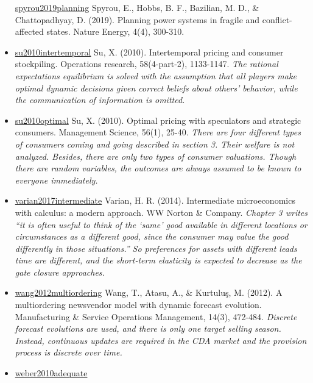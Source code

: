 \documentclass[letterpaper,8pt,twocolumn,twoside,]{pinp}
\begin{document}
\begin{itemize}
  \href{https://www.nature.com/articles/s41560-019-0346-x}{spyrou2019planning}
  Spyrou, E., Hobbs, B. F., Bazilian, M. D., \& Chattopadhyay, D.
  (2019). Planning power systems in fragile and conflict-affected
  states. Nature Energy, 4(4), 300-310.
\item
  \href{https://pubsonline.informs.org/doi/abs/10.1287/opre.1090.0797?casa_token=ToDJ8Q4lVrwAAAAA:PMHqig45Pa7ai5FpOPhTgs-4U8cI_dbkkScDXU9gZBcPngxvOQnVoEJ_qENYKTfUHjLoVAGiwg}{su2010intertemporal}
  Su, X. (2010). Intertemporal pricing and consumer stockpiling.
  Operations research, 58(4-part-2), 1133-1147. \emph{The rational
  expectations equilibrium is solved with the assumption that all
  players make optimal dynamic decisions given correct beliefs about
  others' behavior, while the communication of information is omitted.}
\item
  \href{https://pubsonline.informs.org/doi/10.1287/mnsc.1090.1075}{su2010optimal}
  Su, X. (2010). Optimal pricing with speculators and strategic
  consumers. Management Science, 56(1), 25-40. \emph{There are four
  different types of consumers coming and going described in section 3.
  Their welfare is not analyzed. Besides, there are only two types of
  consumer valuations. Though there are random variables, the outcomes
  are always assumed to be known to everyone immediately.}
\item
  \href{https://wwnorton.com/books/9780393689983/about-the-book/product-details}{varian2017intermediate}
  Varian, H. R. (2014). Intermediate microeconomics with calculus: a
  modern approach. WW Norton \& Company. \emph{Chapter 3 writes ``it is
  often useful to think of the `same' good available in different
  locations or circumstances as a different good, since the consumer may
  value the good differently in those situations.'' So preferences for
  assets with different leads time are different, and the short-term
  elasticity is expected to decrease as the gate closure approaches.}
\item
  \href{https://pubsonline.informs.org/doi/pdf/10.1287/msom.1120.0387}{wang2012multiordering}
  Wang, T., Atasu, A., \& Kurtuluş, M. (2012). A multiordering
  newsvendor model with dynamic forecast evolution. Manufacturing \&
  Service Operations Management, 14(3), 472-484. \emph{Discrete forecast
  evolutions are used, and there is only one target selling season.
  Instead, continuous updates are required in the CDA market and the
  provision process is discrete over time.}
\item
  \href{https://www.sciencedirect.com/science/article/pii/S0301421509005564}{weber2010adequate}

\end{itemize}
\end{document}
